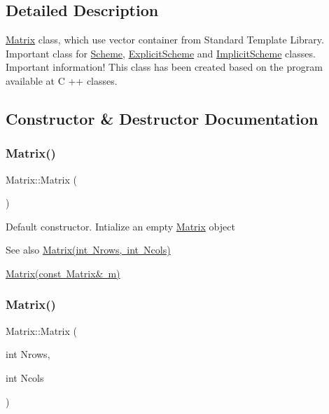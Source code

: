 \subsection{Detailed Description}
\mbox{\hyperlink{class_matrix}{Matrix}} class, which use vector container from Standard Template Library. Important class for \mbox{\hyperlink{class_scheme}{Scheme}}, \mbox{\hyperlink{class_explicit_scheme}{Explicit\+Scheme}} and \mbox{\hyperlink{class_implicit_scheme}{Implicit\+Scheme}} classes. Important information! This class has been created based on the program available at C ++ classes. 

\subsection{Constructor \& Destructor Documentation}
\mbox{\label{class_matrix_a2dba13c45127354c9f75ef576f49269b}} 
\subsubsection{\texorpdfstring{Matrix()}{Matrix()}\hspace{0.1cm}{\footnotesize\ttfamily [1/3]}}
{\footnotesize\ttfamily Matrix\+::\+Matrix (\begin{DoxyParamCaption}{ }\end{DoxyParamCaption})}

Default constructor. Intialize an empty \mbox{\hyperlink{class_matrix}{Matrix}} object \begin{DoxySeeAlso}{See also}
\mbox{\hyperlink{class_matrix_a135a15de1126d735bb95fcc839d739d7}{Matrix(int Nrows, int Ncols)}} 

\mbox{\hyperlink{class_matrix_a765f4dcb51b6829311cc3e7576388423}{Matrix(const Matrix\& m)}} 
\end{DoxySeeAlso}
\mbox{\label{class_matrix_a135a15de1126d735bb95fcc839d739d7}} 
\subsubsection{\texorpdfstring{Matrix()}{Matrix()}\hspace{0.1cm}{\footnotesize\ttfamily [2/3]}}
{\footnotesize\ttfamily Matrix\+::\+Matrix (\begin{DoxyParamCaption}\item[{int}]{Nrows,  }\item[{int}]{Ncols }\end{DoxyParamCaption})}

